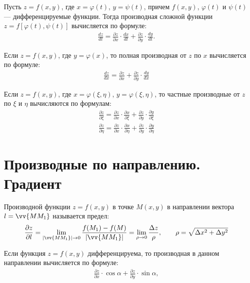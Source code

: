 \documentclass[a4paper,12pt,oneside]{extbook}
\theoremstyle{numbered}
\theoremstyle{unnumbered}
\theoremstyle{named}
\theoremstyle{unnumbered}
\theoremstyle{named}
\theoremstyle{named}
\theoremstyle{named}
\begin{document}
Пусть \(z = f(x, y)\), где \(x = \varphi(t)\), \(y = \psi(t)\), причем \(f(x, y)\), \(\varphi(t)\) и \(\psi(t)\) — дифференцируемые функции. Тогда производная сложной функции \(z = f[\varphi(t), \psi(t)]\) вычисляется по формуле:
\begin{gather*}
    \frac{dz}{dt} = \frac{\partial z}{\partial x} \cdot \frac{dx}{dt} + \frac{\partial z}{\partial y} \cdot \frac{dy}{dt}.
\end{gather*}

Если \(z = f(x, y)\), где \(y = \varphi(x)\), то полная производная от \(z\) по \(x\) вычисляется по формуле:
\begin{gather*}
    \frac{dz}{dx} = \frac{\partial z}{\partial x} + \frac{\partial z}{\partial y} \cdot \frac{dy}{dx}
\end{gather*}

Если \(z = f(x, y)\), где \(x = \varphi(\xi, \eta)\), \(y = \varphi(\xi, \eta)\), то частные производные от \(z\) по \(\xi\) и \(\eta\) вычисляются по формулам:
\begin{gather*}
    \frac{\partial z}{\partial \xi} = \frac{\partial z}{\partial x} \cdot \frac{\partial x}{\partial \xi} + \frac{\partial z}{\partial y} \cdot \frac{\partial y}{\partial \xi} \\
    \frac{\partial z}{\partial \eta} = \frac{\partial z}{\partial x} \cdot \frac{\partial x}{\partial \eta} + \frac{\partial z}{\partial y} \cdot \frac{\partial y}{\partial \eta}
\end{gather*}

\section{Производные по направлению. Градиент}%
\label{sec:Производные по направлению. Градиент}

Производной функции \(z = f(x, y)\) в точке \(M(x, y)\) в направлении вектора \(l = \vv{MM_1}\) называется предел:
\begin{gather*}
    \frac{\partial z}{\partial l} = \lim_{|\vv{MM_1}| \to 0}{\frac{f(M_1) - f(M)}{|\vv{MM_1}|}} = \lim_{\rho \to 0}{\frac{\Delta z}{\rho}},
    \qquad
    \rho = \sqrt{\Delta x^2 + \Delta y^2}
\end{gather*}

Если функция \(z = f(x, y)\) дифференцируема, то производная в данном направлении вычисляется по формуле:
\begin{gather*}
    \frac{\partial z}{\partial x} \cdot \cos{\alpha} + \frac{\partial z}{\partial y} \cdot \sin{\alpha},
\end{gather*}
\end{document}
